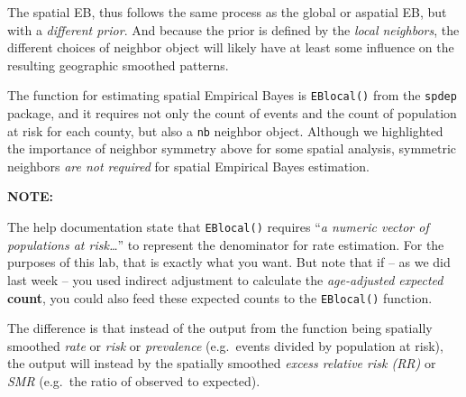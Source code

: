 \documentclass[
]{book}
\newenvironment{Shaded}{\begin{snugshade}}{\end{snugshade}}
\newcommand{\AttributeTok}[1]{\textcolor[rgb]{0.13,0.29,0.53}{#1}}
\newcommand{\CommentTok}[1]{\textcolor[rgb]{0.56,0.35,0.01}{\textit{#1}}}
\newcommand{\DecValTok}[1]{\textcolor[rgb]{0.00,0.00,0.81}{#1}}
\newcommand{\FunctionTok}[1]{\textcolor[rgb]{0.13,0.29,0.53}{\textbf{#1}}}
\newcommand{\NormalTok}[1]{#1}
\newcommand{\OtherTok}[1]{\textcolor[rgb]{0.56,0.35,0.01}{#1}}
\newcommand{\SpecialCharTok}[1]{\textcolor[rgb]{0.81,0.36,0.00}{\textbf{#1}}}
\newenvironment{rmdnote}[1]
  {
  \begin{itemize}
  \renewcommand{\labelitemi}{
    \raisebox{-.7\height}[0pt][0pt]{
      {\setkeys{Gin}{width=3em,keepaspectratio}\texttt{[image: images/\#1]}}
    }
  }
  \setlength{\fboxsep}{1em}
  \begin{note}
  \item
  }
  {
  \end{note}
  \end{itemize}
  }
\begin{document}
The spatial EB, thus follows the same process as the global or aspatial EB, but with a \emph{different prior}. And because the prior is defined by the \emph{local neighbors}, the different choices of neighbor object will likely have at least some influence on the resulting geographic smoothed patterns.

The function for estimating spatial Empirical Bayes is \texttt{EBlocal()} from the \texttt{spdep} package, and it requires not only the count of events and the count of population at risk for each county, but also a \texttt{nb} neighbor object. Although we highlighted the importance of neighbor symmetry above for some spatial analysis, symmetric neighbors \emph{are not required} for spatial Empirical Bayes estimation.

\begin{rmdnote}{note}
\textbf{NOTE:}

The help documentation state that \texttt{EBlocal()} requires ``\emph{a numeric vector of populations at risk\ldots{}}'' to represent the denominator for rate estimation. For the purposes of this lab, that is exactly what you want. But note that if -- as we did last week -- you used indirect adjustment to calculate the \emph{age-adjusted expected} \textbf{count}, you could also feed these expected counts to the \texttt{EBlocal()} function.

The difference is that instead of the output from the function being spatially smoothed \emph{rate} or \emph{risk} or \emph{prevalence} (e.g.~events divided by population at risk), the output will instead by the spatially smoothed \emph{excess relative risk (RR)} or \emph{SMR} (e.g.~the ratio of observed to expected).

\end{rmdnote}

\begin{Shaded}
\end{Shaded}
\end{document}
